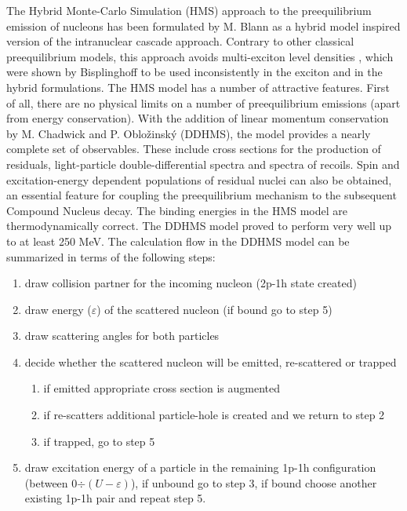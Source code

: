 The Hybrid Monte-Carlo Simulation (HMS) approach to the preequilibrium
emission of nucleons has been formulated by M. Blann \cite{Blann-HMS} as a
hybrid model \cite{hybrid,hybrid1,hybrid2,hybrid3} inspired version of the
intranuclear cascade approach. Contrary to other classical preequilibrium
models, this approach avoids multi-exciton level densities%
, which were shown by Bisplinghoff \cite%
{Bisplinghoff} to be used inconsistently in the exciton and in the hybrid
formulations. The HMS%
 model has a number of attractive features. First of all, there
are no physical limits on a number of preequilibrium emissions (apart from
energy conservation). With the addition of linear momentum conservation by
M. Chadwick and P. Oblo\v zinsk\' y (DDHMS), the model provides a nearly
complete set of observables. These include cross sections for the production
of residuals, light-particle double-differential spectra and spectra of
recoils. Spin and excitation-energy dependent populations of residual nuclei
can also be obtained, an essential feature for coupling the preequilibrium
mechanism to the subsequent Compound Nucleus decay. The binding energies in
the HMS%
 model are thermodynamically correct. The DDHMS model proved to
perform very well 
up to at least 250 MeV. %
The calculation flow in the DDHMS model can be summarized in terms of the
following steps:

\begin{enumerate}
\item draw collision partner for the incoming nucleon (2p-1h state created)

\item draw energy ($\varepsilon$) of the scattered nucleon (if bound go to
step 5)

\item draw scattering angles for both particles

\item decide whether the scattered nucleon will be emitted, re-scattered or
trapped

\begin{enumerate}
\item if emitted appropriate cross section is augmented

\item if re-scatters additional particle-hole is created and we return to
step 2

\item if trapped, go to step 5
\end{enumerate}

\item draw excitation energy of a particle in the remaining 1p-1h
configuration (between 0$\div(U-\varepsilon)$), if unbound go to step 3, if
bound choose another existing 1p-1h pair and repeat step 5.
\end{enumerate}

